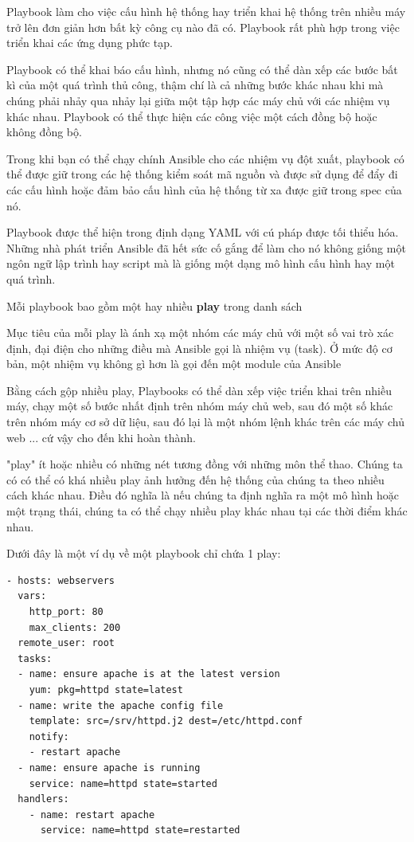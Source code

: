 Playbook làm cho việc cấu hình hệ thống hay triển khai hệ thống trên nhiều máy trở lên đơn giản hơn bất kỳ công cụ nào đã có. Playbook rất phù hợp trong việc triển khai các ứng dụng phức tạp.

Playbook có thể khai báo cấu hình, nhưng nó cũng có thể dàn xếp các bước bất kì của một quá trình thủ công, thậm chí là cả những bước khác nhau khi mà chúng phải nhảy qua nhảy lại giữa một tập hợp các máy chủ với các nhiệm vụ khác nhau. Playbook có thể thực hiện các công việc một cách đồng bộ hoặc không đồng bộ.

Trong khi bạn có thể chạy chính Ansible cho các nhiệm vụ đột xuất, playbook có thể được giữ trong các hệ thống kiểm soát mã nguồn và được sử dụng để đẩy đi các cấu hình hoặc đảm bảo cấu hình của hệ thống từ xa được giữ trong spec của nó.

Playbook được thể hiện trong định dạng YAML với cú pháp được tối thiểu hóa. Những nhà phát triển Ansible đã hết sức cố gắng để làm cho nó không giống một ngôn ngữ lập trình hay script mà là giống một dạng mô hình cấu hình hay một quá trình.

Mỗi playbook bao gồm một hay nhiều \textbf{play} trong danh sách

Mục tiêu của mỗi play là ánh xạ một nhóm các máy chủ với một số vai trò xác định, đại điện cho những điều mà Ansible gọi là nhiệm vụ (task). Ở mức độ cơ bản, một nhiệm vụ không gì hơn là gọi đến một module của Ansible

Bằng cách gộp nhiều play, Playbooks có thể dàn xếp việc triển khai trên nhiều máy, chạy một số bước nhất định trên nhóm máy chủ web, sau đó một số khác trên nhóm máy cơ sở dữ liệu, sau đó lại là một nhóm lệnh khác trên các máy chủ web ... cứ vậy cho đến khi hoàn thành.

"play" ít hoặc nhiều có những nét tương đồng với những môn thể thao. Chúng ta có có thể có khá nhiều play ảnh hưởng đến hệ thống của chúng ta theo nhiều cách khác nhau. Điều đó nghĩa là nếu chúng ta định nghĩa ra một mô hình hoặc một trạng thái, chúng ta có thể chạy nhiều play khác nhau tại các thời điểm khác nhau.

Dưới đây là một ví dụ về một playbook chỉ chứa 1 play:

\begin{lstlisting}[label={lst:ansible_playbook_example},caption={Ví dụ về playbook của Ansible},morekeywords={hosts, vars, tasks, name, yum, http_port, max_clients, remote_user, template, service, handlers, notify, state, pkg, src, dest}]
- hosts: webservers
  vars:
    http_port: 80
    max_clients: 200
  remote_user: root
  tasks:
  - name: ensure apache is at the latest version
    yum: pkg=httpd state=latest
  - name: write the apache config file
    template: src=/srv/httpd.j2 dest=/etc/httpd.conf
    notify:
    - restart apache
  - name: ensure apache is running
    service: name=httpd state=started
  handlers:
    - name: restart apache
      service: name=httpd state=restarted
\end{lstlisting}

